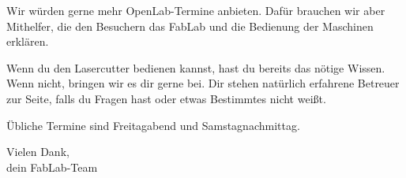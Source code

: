 \documentclass[a4paper]{scrartcl}
\begin{document}
\Schild[0.85]

Wir würden gerne mehr OpenLab-Termine anbieten. Dafür brauchen wir aber Mithelfer, die den
Besuchern das FabLab und die Bedienung der Maschinen erklären.

Wenn du den Lasercutter bedienen kannst, hast du bereits das nötige Wissen. Wenn nicht,
bringen wir es dir gerne bei. Dir stehen natürlich erfahrene Betreuer zur Seite, falls du
Fragen hast oder etwas Bestimmtes nicht weißt.


Übliche Termine sind Freitagabend und Samstagnachmittag.

Vielen Dank,\\ dein FabLab-Team

\vfill
{}
\end{document}

